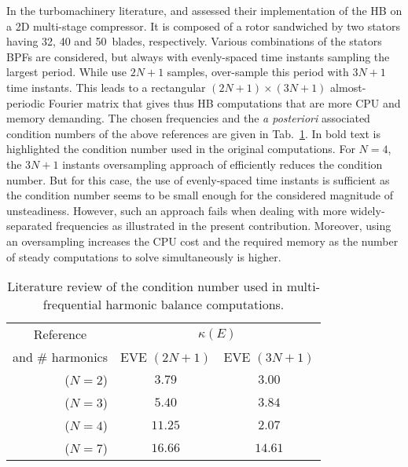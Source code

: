 
In the turbomachinery literature, \citet{Gopinath2007} and
\citet{Ekici2007} assessed their implementation of the
HB on a 2D multi-stage compressor. 
It is composed of a rotor sandwiched by two stators having
32, 40 and 50~blades, respectively. Various combinations of the stators
BPFs are considered, but always with evenly-spaced time instants sampling the
largest period.  While \citet{Gopinath2007} use $2N+1$ samples,
\citet{Ekici2007} over-sample this period with $3N+1$ time instants. This
leads to a rectangular $(2N+1)\times(3N+1)$ almost-periodic Fourier
matrix that gives thus HB computations that are more CPU and memory demanding. 
The chosen frequencies and the \emph{a posteriori}
associated condition numbers of the above references are given in
Tab.~\ref{tab:literature_multistage}.  
In bold text is highlighted the condition number used in the
original computations.
For $N=4$, the $3N+1$ instants
oversampling approach of \citet{Ekici2007} efficiently reduces the
condition number. But for this case, the use of evenly-spaced time
instants is sufficient as the condition number seems to be small enough
for the considered magnitude of unsteadiness.  However, such an
approach fails when dealing with more widely-separated frequencies as
illustrated in the present contribution. 
Moreover, using an oversampling increases
the CPU cost and the required memory as the number of steady computations
to solve simultaneously is higher.
\begin{table}[htp]
   \centering
  \begin{tabular}{rcc}
    \toprule
    \multicolumn{1}{c}{Reference} & \multicolumn{2}{c}{$\kappa(E)$} \\
    \multicolumn{1}{c}{and \# harmonics} & EVE $(2N+1)$ & EVE $(3N+1)$ \\
    \midrule
    \citet{Gopinath2007} ($N=2$) & $\mathbf{3.79}$ & $3.00$ \\
    \citet{Ekici2007} ($N=3$) & $5.40$ & $\mathbf{3.84}$ \\
    \citet{Gopinath2007} ($N=4$) & $\mathbf{11.25}$ & $2.07$ \\
    \citet{Gopinath2007} ($N=7$) & $\mathbf{16.66}$ & $14.61$ \\
    \bottomrule
  \end{tabular}
  \caption{Literature review of the condition number used in multi-frequential
  harmonic balance computations.}
  \label{tab:literature_multistage}
\end{table}
